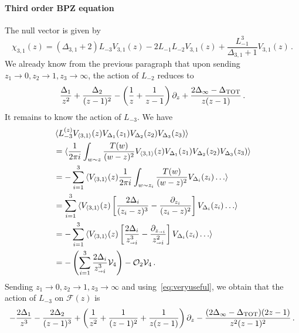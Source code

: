 \documentclass[11pt]{article}
\begin{document}
\paragraph{Third order BPZ equation}
The null vector is given by 
\begin{equation}\label{eq:decoupling3}
  \chi_{3,1}(z)=(\Delta_{3,1}+2)L_{-3} V_{3,1}(z) -2 L_{-1} L_{-2}V_{3,1}(z)+\frac{L_{-1}^3}{\Delta_{3,1}+1}V_{3,1}(z)\,.
\end{equation}
We already know from the previous paragraph that upon sending $z_1 \to 0, z_2 \to 1, z_{3}\to \infty$, the action of $L_{-2}$ reduces to
\begin{equation}\label{eq:l-2}
  \frac{\Delta_1}{z^2}+\frac{\Delta_2}{(z-1)^2}-\left(\frac{1}{z}+\frac{1}{z-1}\right)\partial_z +\frac{2\Delta_{\infty}-\Delta_{\rm TOT}}{z(z-1)}\,.
\end{equation}
It remains to know the action of $L_{-3}$. We have
\begin{equation}
  \begin{aligned}
    &\braket{L_{-3}^{(z)}V_{\braket{3,1}}(z)V_{\Delta_1}(z_1)V_{\Delta_2}(z_2)V_{\Delta_3}(z_3)}\\
    &=\braket{\frac{1}{2\pi i}\int _{w \sim z} \frac{T(w)}{(w-z)^2}V_{\braket{3,1}}(z)V_{\Delta_1}(z_1)V_{\Delta_2}(z_2)V_{\Delta_3}(z_3)}\\
    &=-\sum_{i=1}^3 \braket{V_{\braket{3,1}}(z) \frac{1}{2\pi i}\int _{w \sim z_i} \frac{T(w)}{(w-z)^2}V_{\Delta_i}(z_i) \dots}\\
    &=\sum_{i=1}^3 \braket{V_{\braket{3,1}}(z) \left[\frac{2\Delta_i}{(z_i-z)^3}-\frac{\partial_{z_i}}{(z_i-z)^2}\right]V_{\Delta_i}(z_i) \dots}\\
    &=-\sum_{i=1}^3 \braket{V_{\braket{3,1}}(z) \left[\frac{2\Delta_i}{z_{\shortrightarrow i}^3}-\frac{\partial_{z_{\shortrightarrow i}}}{z_{\shortrightarrow i}^2}\right]V_{\Delta_i}(z_i) \dots}\\
    &=-\left(\sum_{i=1}^3 \frac{2\Delta_i}{z_{\shortrightarrow i}^3}\mathcal{V}_{4}\right)-\mathcal{O}_{2} \mathcal{V}_{4}\,.
  \end{aligned}
\end{equation}
Sending $z_1 \to 0, z_2 \to 1, z_{3}\to \infty$ and using~\eqref{eq:veryuseful}, we obtain that the action of $L_{-3}$ on $\mathcal{F}(z)$ is
\begin{equation}\label{eq:l-3}
  -\frac{2\Delta_1}{z^3}-\frac{2\Delta_2}{(z-1)^3}+\left(\frac{1}{z^2}+\frac{1}{(z-1)^2}+\frac{1}{z(z-1)}\right)\partial_z -\frac{(2\Delta_{\infty}-\Delta_{\rm TOT})(2z-1)}{z^2(z-1)^2}\,.
\end{equation}
\end{document}
